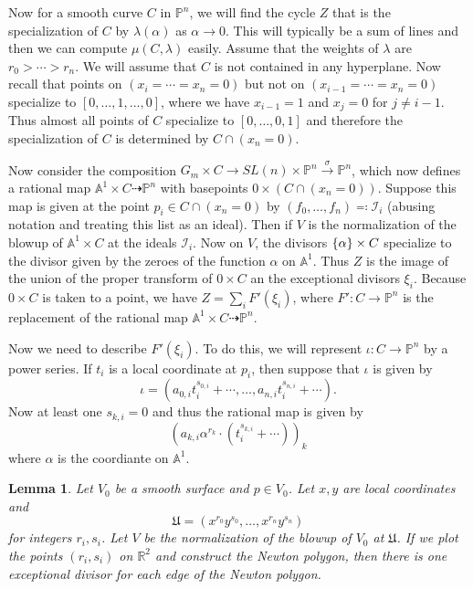 \documentclass[leqno, openany]{memoir}
\newtheorem{lem}[thm]{Lemma}
\theoremstyle{definition}
\theoremstyle{remark}
\theoremstyle{plain}
\theoremstyle{definition}
\theoremstyle{remark}
\newcommand{\A}{\mathbb{A}}
\newcommand{\R}{\mathbb{R}}
\renewcommand{\P}{\mathbb{P}}
\newcommand{\mc}[1]{\mathcal{#1}}
\newcommand{\mf}[1]{\mathfrak{#1}}
\begin{document}
Now for a smooth curve $C$ in $\P^n$, we will find the cycle $Z$ that is the specialization of $C$ by $\lambda(\alpha)$ as $\alpha \to 0$. This will typically be a sum of lines and then we can compute $\mu(C, \lambda)$ easily. Assume that the weights of $\lambda$ are $r_0 > \cdots > r_n$. We will assume that $C$ is not contained in any hyperplane. Now recall that points on $(x_i = \cdots = x_n = 0)$ but not on $(x_{i-1} = \cdots = x_{n}=0)$ specialize to $[0, \ldots, 1, \ldots, 0]$, where we have $x_{i-1} = 1$ and $x_j = 0$ for $j \neq i-1$. Thus almost all points of $C$ specialize to $[0, \ldots, 0, 1]$ and therefore the specialization of $C$ is determined by $C \cap (x_n = 0)$.

Now consider the composition $G_m \times C \to SL(n) \times \P^n \xrightarrow{\sigma} \P^n$, which now defines a rational map $\A^1 \times C \dashrightarrow \P^n$ with basepoints $\qty{0} \times (C \cap (x_n = 0))$. Suppose this map is given at the point $p_i \in C \cap (x_n = 0)$ by $(f_0, \ldots, f_n) \eqqcolon \mc{I}_i$ (abusing notation and treating this list as an ideal). Then if $V$ is the normalization of the blowup of $\A^1 \times C$ at the ideals $\mc{I}_i$. Now on $V$, the divisors $\qty{\alpha} \times C$ specialize to the divisor given by the zeroes of the function $\alpha$ on $\A^1$. Thus $Z$ is the image of the union of the proper transform of  $\qty{0} \times C$ an the exceptional divisors $\xi_i$. Because $0 \times C$ is taken to a point, we have $Z = \sum_i F'(\xi_i)$, where $F' \colon C \to \P^n$ is the replacement of the rational map $\A^1 \times C \dashrightarrow \P^n$.

Now we need to describe $F'(\xi_i)$. To do this, we will represent $\iota \colon C \to \P^n$ by a power series. If $t_i$ is a local coordinate at $p_i$, then suppose that $\iota$ is given by
\[ \iota = (a_{0,i} t_i^{s_{0,i}} + \cdots, \ldots, a_{n,i} t_i^{s_{n,i}} + \cdots). \]
Now at least one $s_{k,i} = 0$ and thus the rational map is given by
\[ (a_{k,i} \alpha^{r_k} \cdot (t_i^{s_{k,i}} + \cdots) )_k \]
where $\alpha$ is the coordiante on $\A^1$.

\begin{lem}
    Let $V_0$ be a smooth surface and $p \in V_0$. Let $x,y$ are local coordinates and 
    \[ \mf{U} = (x^{r_0} y^{s_0}, \ldots, x^{r_n} y^{s_n}) \]
    for integers $r_i, s_i$. Let $V$ be the normalization of the blowup of $V_0$ at $\mf{U}$. If we plot the points $(r_i, s_{i})$ on $\R^2$ and construct the Newton polygon, then there is one exceptional divisor for each edge of the Newton polygon.
\end{lem}
\end{document}
